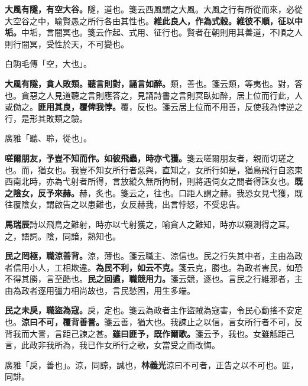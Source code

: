 \textbf{大風有隧，有空大谷。}{\footnotesize 隧，道也。箋云西風謂之大風。大風之行有所從而來，必從大空谷之中，喻賢愚之所行各由其性也。}\textbf{維此良人，作為式穀。維彼不順，征以中垢。}{\footnotesize 中垢，言闇冥也。箋云作起、式用、征行也。賢者在朝則用其善道，不順之人則行闇冥，受性於天，不可變也。}

\begin{quoting}白駒毛傳「空，大也」。\end{quoting}

\textbf{大風有隧，貪人敗類。聽言則對，誦言如醉。}{\footnotesize 類，善也。箋云類，等夷也。對，答也。貪惡之人見道聽之言則應答之，見誦詩書之言則冥臥如醉，居上位而行此，人或俲之。}\textbf{匪用其良，覆俾我悖。}{\footnotesize 覆，反也。箋云居上位而不用善，反使我為悖逆之行，是形其敗類之驗。}

\begin{quoting}廣雅「聽、聆，從也」。\end{quoting}

\textbf{嗟爾朋友，予豈不知而作。如彼飛蟲，時亦弋獲。}{\footnotesize 箋云嗟爾朋友者，親而切瑳之也。而，猶女也。我豈不知女所行者惡與，直知之，女所行如是，猶鳥飛行自恣東西南北時，亦為弋射者所得，言放縱久無所拘制，則將遇伺女之間者得誅女也。}\textbf{既之陰女，反予來赫。}{\footnotesize 赫，炙也。箋云之，往也。口距人謂之赫。我恐女見弋獲，既往覆陰女，謂啟告之以患難也，女反赫我，出言悖怒，不受忠告。}

\begin{quoting}\textbf{馬瑞辰}詩以飛鳥之難射，時亦以弋射獲之，喻貪人之難知，時亦以窺測得之耳。之，語詞。陰，同諳，熟知也。\end{quoting}

\textbf{民之罔極，職涼善背。}{\footnotesize 涼，薄也。箋云職主、涼信也。民之行失其中者，主由為政者信用小人，工相欺違。}\textbf{為民不利，如云不克。}{\footnotesize 箋云克，勝也。為政者害民，如恐不得其勝，言至酷也。}\textbf{民之回遹，職競用力。}{\footnotesize 箋云競，逐也。言民之行維邪者，主由為政者逐用彊力相尚故也，言民愁困，用生多端。}

\textbf{民之未戾，職盜為寇。}{\footnotesize 戾，定也。箋云為政者主作盜賊為寇害，令民心動搖不安定也。}\textbf{涼曰不可，覆背善詈。}{\footnotesize 箋云善，猶大也。我諫止之以信，言女所行者不可，反背我而大詈，言距己諫之甚。}\textbf{雖曰匪予，既作爾歌。}{\footnotesize 箋云予，我也。女雖觝距己言，此政非我所為，我已作女所行之歌，女當受之而改悔。}

\begin{quoting}廣雅「戾，善也」。涼，同諒，誠也，\textbf{林義光}涼曰不可者，正告之以不可也。匪，同誹。\end{quoting}

